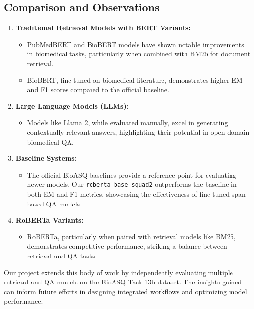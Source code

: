 \documentclass{article}
\begin{document}
\subsection{Comparison and Observations}
\begin{enumerate}
    \item \textbf{Traditional Retrieval Models with BERT Variants:}
    \begin{itemize}
        \item PubMedBERT and BioBERT models have shown notable improvements in biomedical tasks, particularly when combined with BM25 for document retrieval.
        \item BioBERT, fine-tuned on biomedical literature, demonstrates higher EM and F1 scores compared to the official baseline.
    \end{itemize}
    \item \textbf{Large Language Models (LLMs):}
    \begin{itemize}
        \item Models like Llama 2, while evaluated manually, excel in generating contextually relevant answers, highlighting their potential in open-domain biomedical QA.
    \end{itemize}
    \item \textbf{Baseline Systems:}
    \begin{itemize}
        \item The official BioASQ baselines provide a reference point for evaluating newer models. Our \texttt{roberta-base-squad2} outperforms the baseline in both EM and F1 metrics, showcasing the effectiveness of fine-tuned span-based QA models.
    \end{itemize}
    \item \textbf{RoBERTa Variants:}
    \begin{itemize}
        \item RoBERTa, particularly when paired with retrieval models like BM25, demonstrates competitive performance, striking a balance between retrieval and QA tasks.
    \end{itemize}
\end{enumerate}
Our project extends this body of work by independently evaluating multiple retrieval and QA models on the BioASQ Task-13b dataset. The insights gained can inform future efforts in designing integrated workflows and optimizing model performance.
\end{document}
